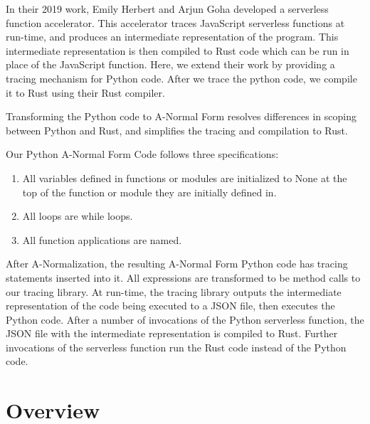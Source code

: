 \documentclass[acmsmall,review,authorversion]{acmart}
\begin{document}
In their 2019 work, Emily Herbert and Arjun Goha developed a serverless function accelerator. This accelerator traces JavaScript serverless functions at run-time, and produces an intermediate representation of the program. This intermediate representation is then compiled to Rust code which can be run in place of the JavaScript function. Here, we extend their work by providing a tracing mechanism for Python code. After we trace the python code, we compile it to Rust using their Rust compiler. 
 \par
 Transforming the Python code to A-Normal Form resolves differences in scoping between Python and Rust, and simplifies the tracing and compilation to Rust.
 \par
 Our Python A-Normal Form Code follows three specifications:
\begin{enumerate}
    \item All variables defined in functions or modules are initialized to None at the top of the function or module they are initially defined in. 
    \item All loops are while loops.
    \item All function applications are named.
\end{enumerate}
After A-Normalization, the resulting A-Normal Form Python code has tracing statements inserted into it. All expressions are transformed to be method calls to our tracing library. At run-time, the tracing library outputs the intermediate representation of the code being executed to a JSON file, then executes the Python code. After a number of invocations of the Python serverless function, the JSON file with the intermediate representation is compiled to Rust. Further invocations of the serverless function run the Rust code instead of the Python code. 

\section{Overview}
\end{document}
